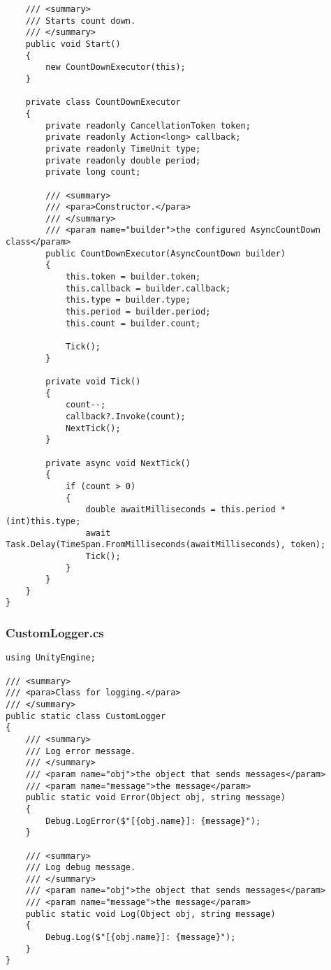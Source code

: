 \begin{verbatim}
    /// <summary>
    /// Starts count down.
    /// </summary>
    public void Start()
    {
        new CountDownExecutor(this);
    }

    private class CountDownExecutor
    {
        private readonly CancellationToken token;
        private readonly Action<long> callback;
        private readonly TimeUnit type;
        private readonly double period;
        private long count;

        /// <summary>
        /// <para>Constructor.</para>
        /// </summary>
        /// <param name="builder">the configured AsyncCountDown class</param>
        public CountDownExecutor(AsyncCountDown builder)
        {
            this.token = builder.token;
            this.callback = builder.callback;
            this.type = builder.type;
            this.period = builder.period;
            this.count = builder.count;

            Tick();
        }

        private void Tick()
        {
            count--;
            callback?.Invoke(count);
            NextTick();
        }

        private async void NextTick()
        {
            if (count > 0)
            {
                double awaitMilliseconds = this.period * (int)this.type;
                await Task.Delay(TimeSpan.FromMilliseconds(awaitMilliseconds), token);
                Tick();
            }
        }
    }
}
\end{verbatim}
\subsubsection*{CustomLogger.cs}
\begin{verbatim}
using UnityEngine;

/// <summary>
/// <para>Class for logging.</para>
/// </summary>
public static class CustomLogger
{
    /// <summary>
    /// Log error message.
    /// </summary>
    /// <param name="obj">the object that sends messages</param>
    /// <param name="message">the message</param>
    public static void Error(Object obj, string message)
    {
        Debug.LogError($"[{obj.name}]: {message}");
    }

    /// <summary>
    /// Log debug message.
    /// </summary>
    /// <param name="obj">the object that sends messages</param>
    /// <param name="message">the message</param>
    public static void Log(Object obj, string message)
    {
        Debug.Log($"[{obj.name}]: {message}");
    }
}
\end{verbatim}
